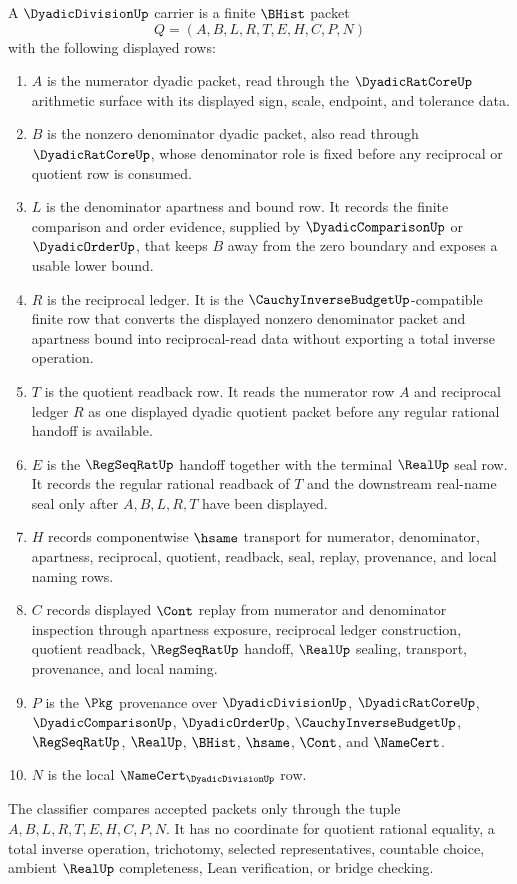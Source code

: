 \begin{definition}
\label{def:dyadic-division-carrier}
A $\DyadicDivisionUp$ carrier is a finite $\BHist$ packet
$$
Q=(A,B,L,R,T,E,H,C,P,N)
$$
with the following displayed rows:
\begin{enumerate}
\item $A$ is the numerator dyadic packet, read through the $\DyadicRatCoreUp$ arithmetic surface with its displayed sign, scale, endpoint, and tolerance data.
\item $B$ is the nonzero denominator dyadic packet, also read through $\DyadicRatCoreUp$, whose denominator role is fixed before any reciprocal or quotient row is consumed.
\item $L$ is the denominator apartness and bound row. It records the finite comparison and order evidence, supplied by $\DyadicComparisonUp$ or $\DyadicOrderUp$, that keeps $B$ away from the zero boundary and exposes a usable lower bound.
\item $R$ is the reciprocal ledger. It is the $\CauchyInverseBudgetUp$-compatible finite row that converts the displayed nonzero denominator packet and apartness bound into reciprocal-read data without exporting a total inverse operation.
\item $T$ is the quotient readback row. It reads the numerator row $A$ and reciprocal ledger $R$ as one displayed dyadic quotient packet before any regular rational handoff is available.
\item $E$ is the $\RegSeqRatUp$ handoff together with the terminal $\RealUp$ seal row. It records the regular rational readback of $T$ and the downstream real-name seal only after $A,B,L,R,T$ have been displayed.
\item $H$ records componentwise $\hsame$ transport for numerator, denominator, apartness, reciprocal, quotient, readback, seal, replay, provenance, and local naming rows.
\item $C$ records displayed $\Cont$ replay from numerator and denominator inspection through apartness exposure, reciprocal ledger construction, quotient readback, $\RegSeqRatUp$ handoff, $\RealUp$ sealing, transport, provenance, and local naming.
\item $P$ is the $\Pkg$ provenance over $\DyadicDivisionUp$, $\DyadicRatCoreUp$, $\DyadicComparisonUp$, $\DyadicOrderUp$, $\CauchyInverseBudgetUp$, $\RegSeqRatUp$, $\RealUp$, $\BHist$, $\hsame$, $\Cont$, and $\NameCert$.
\item $N$ is the local $\NameCert_{\DyadicDivisionUp}$ row.
\end{enumerate}
The classifier compares accepted packets only through the tuple $A,B,L,R,T,E,H,C,P,N$. It has no coordinate for quotient rational equality, a total inverse operation, trichotomy, selected representatives, countable choice, ambient $\RealUp$ completeness, Lean verification, or bridge checking.
\end{definition}

